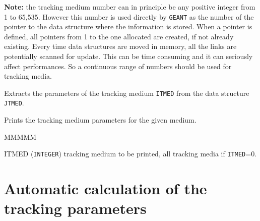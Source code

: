 {\bf Note:} the tracking medium number can in principle be any positive
integer from 1 to 65,535. However this number is used directly by {\tt GEANT}
as the number of the pointer to the data structure where the information
is stored. When a pointer is defined,
all pointers from 1 to the one allocated are created, if not already existing.
Every time data structures are moved in memory, all the
links are potentially scanned for update. This can be time consuming and
it can seriously affect performances. So a continuous
range of numbers should be used for tracking media.

 
Extracts the parameters of the tracking medium {\tt ITMED}
from the data structure {\tt JTMED}.
 
 
Prints the tracking medium parameters for the given medium.
\begin{DLtt}{MMMMM}
\item[ITMED]      ({\tt INTEGER}) tracking medium to be printed,
all tracking media if {\tt ITMED}=0.
\end{DLtt}

\section*{Automatic calculation of the tracking parameters}

